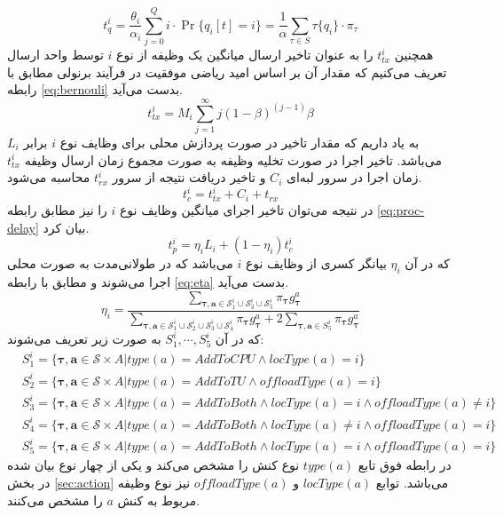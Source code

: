 \begin{equation}
	\label{eq:queuing-delay}
	t_{q}^i=\frac{\theta_i}{\alpha_i} \sum_{j=0}^{Q} i \cdot \operatorname{Pr}\{q_i[t]=i\}=\frac{1}{\alpha} \sum_{\tau \in S} \tau\{q_i\} \cdot \pi_{\tau}
\end{equation}
همچنین $t_{tx}^i$ را به عنوان تاخیر ارسال میانگین یک وظیفه از نوع \(i\) توسط واحد ارسال تعریف می‌کنیم که مقدار آن بر اساس امید ریاضی موفقیت در فرآیند برنولی مطابق با رابطه \ref{eq:bernouli} بدست می‌آید.
\begin{equation}
	\label{eq:bernouli}
	t_{t x}^i=M_i \sum_{j=1}^{\infty} j(1-\beta)^{(j-1)} \beta
\end{equation}
به یاد داریم که مقدار تاخیر در صورت پردازش محلی برای وظایف نوع $i$ برابر $L_i$ می‌باشد. تاخیر اجرا در صورت تخلیه وظیفه به صورت مجموع زمان ارسال وظیفه
$t_{tx}^i$
زمان اجرا در سرور لبه‌ای
$C_i$
و تاخیر دریافت نتیجه از سرور
$t_{rx}^i$
محاسبه می‌شود.
\begin{equation}
	t_{c}^i=t_{t x}^i+C_i+t_{rx}
\end{equation}
در نتیجه می‌توان تاخیر اجرای میانگین وظایف نوع $i$ را نیز مطابق رابطه \ref{eq:proc-delay} بیان کرد.
\begin{equation}
	\label{eq:proc-delay}
	t_{p}^i=\eta_i L_i+(1-\eta_i) t_{c}^i
\end{equation}
که در آن
$\eta_i$
بیانگر کسری از وظایف نوع $i$ می‌باشد که در طولانی‌مدت به صورت محلی اجرا می‌شوند و مطابق با رابطه \ref{eq:eta} بدست می‌آيد.
\begin{equation}
	\label{eq:eta}
	\eta_i=\frac{\sum_{\boldsymbol{\tau, a} \in \mathcal{S}_{1}^i\cup\mathcal{S}_{3}^i\cup\mathcal{S}_{5}^i} \pi_{\boldsymbol{\tau}} g_{\boldsymbol{\tau}}^{a} }{\sum_{\boldsymbol{\tau, a} \in \mathcal{S}_{1}^i\cup\mathcal{S}_{2}^i\cup\mathcal{S}_{3}^i\cup\mathcal{S}_{4}^i} \pi_{\boldsymbol{\tau}} g_{\boldsymbol{\tau}}^{a} + 2 \sum_{\boldsymbol{\tau, a} \in S_5^i} \pi_{\boldsymbol{\tau}} g_{\boldsymbol{\tau}}^{a}}
\end{equation}
که در آن
$S_1^i, \cdots, S_5^i$
به صورت زیر تعریف می‌شوند:
\begin{equation}
	\begin{aligned}
		& S_1^i = \{\boldsymbol{\tau, a} \in \mathcal{S} \times A | type(a) = AddToCPU \land locType(a) = i\} \\
		& S_2^i = \{\boldsymbol{\tau, a} \in \mathcal{S} \times A | type(a) = AddToTU \land offloadType(a) = i\} \\ 
		& S_3^i = \{\boldsymbol{\tau, a} \in \mathcal{S} \times A | type(a) = AddToBoth \land locType(a) = i \land offloadType(a) \neq i\} \\
		& S_4^i = \{\boldsymbol{\tau, a} \in \mathcal{S} \times A | type(a) = AddToBoth \land locType(a) \neq i \land offloadType(a) = i\} \\
		& S_5^i = \{\boldsymbol{\tau, a} \in \mathcal{S} \times A | type(a) = AddToBoth \land locType(a) = i \land offloadType(a) = i\}
	\end{aligned}
\end{equation}
در رابطه فوق تابع $type(a)$ نوع کنش را مشخص می‌کند و یکی از چهار نوع بیان شده در بخش \ref{sec:action} می‌باشد. توابع
$locType(a)$
و
$offloadType(a)$
نیز نوع وظیفه مربوط به کنش $a$ را مشخص می‌کنند. \\

